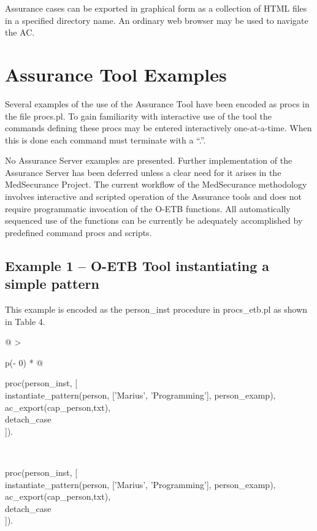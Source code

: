 \documentclass[12pt,twoside,a4paper]{article}
\begin{document}
Assurance cases can be exported in graphical form as a collection of HTML files in a specified directory name. An ordinary web browser may be used to navigate the AC.

\clearpage
\hypertarget{assurance-tool-examples}{%
\section{Assurance Tool Examples}\label{assurance-tool-examples}}

Several examples of the use of the Assurance Tool have been encoded as procs in the file procs.pl. To gain familiarity with interactive use of the tool the commands defining these procs may be entered interactively one-at-a-time. When this is done each command must terminate with a ``.''.

No Assurance Server examples are presented. Further implementation of the Assurance Server has been deferred unless a clear need for it arises in the MedSecurance Project. The current workflow of the MedSecurance methodology involves interactive and scripted operation of the Assurance tools and does not require programmatic invocation of the O-ETB functions. All automatically sequenced use of the functions can be currently be adequately accomplished by predefined command procs and scripts.

\hypertarget{example-1-o-etb-tool-instantiating-a-simple-pattern}{%
\subsection{Example 1 -- O-ETB Tool instantiating a simple pattern}\label{example-1-o-etb-tool-instantiating-a-simple-pattern}}

This example is encoded as the person\_inst procedure in procs\_etb.pl as shown in Table 4.

\begin{longtable}[]{@{}
  >{\raggedright\arraybackslash}p{(\columnwidth - 0\tabcolsep) * }@{}}
\caption{\protect\hypertarget{_Ref168411618}{}{}Table Example 1 -- instantiating a simple pattern and exporting the result}\tabularnewline
\toprule
\begin{minipage}[b]{\linewidth}\raggedright
proc(person\_inst, {[}\\
instantiate\_pattern(person, {[}'Marius', 'Programming'{]}, person\_examp),\\
ac\_export(cap\_person,txt),\\
detach\_case\\
{]}).\strut
\end{minipage} \\
\midrule
\endfirsthead
\toprule
\begin{minipage}[b]{\linewidth}\raggedright
proc(person\_inst, {[}\\
instantiate\_pattern(person, {[}'Marius', 'Programming'{]}, person\_examp),\\
ac\_export(cap\_person,txt),\\
detach\_case\\
{]}).\strut
\end{minipage} \\
\midrule
\endhead
\bottomrule
\end{longtable}
\end{document}
